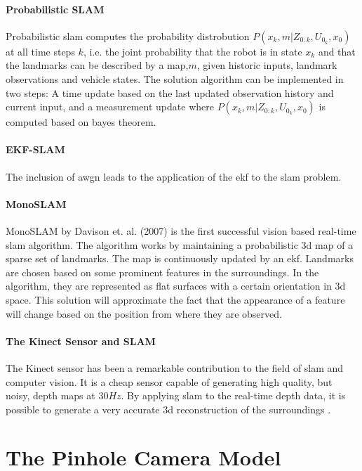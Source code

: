\paragraph{Probabilistic SLAM}
Probabilistic \gls{slam} computes the probability distrobution $P(x_k,m|Z_{0:k},U_{0_k},x_0)$ at all time steps $k$\cite{SLAMp1}, i.e. the joint probability that the robot is in state \boldmath$x_k$ and that the landmarks can be described by a map,\boldmath$m$, given historic inputs, landmark observations and vehicle states. The solution algorithm can be implemented in two steps: A time update based on the last updated observation history and current input, and a measurement update where $P(x_k,m|Z_{0:k},U_{0_k},x_0)$ is computed based on bayes theorem. 


\paragraph{EKF-SLAM}

The inclusion of \gls{awgn} leads to the application of the \gls{ekf} to the \gls{slam} problem\cite{SLAMp1}.
\paragraph{MonoSLAM}

MonoSLAM by Davison et. al. (2007) is the first successful vision based real-time \gls{slam} algorithm\cite{monoSLAM}. The algorithm works by maintaining a probabilistic 3d map of a sparse set of landmarks. The map is continuously updated by an \gls{ekf}. Landmarks are chosen based on some prominent features in the surroundings. In the algorithm, they are represented as flat surfaces with a certain orientation in 3d space. This solution will approximate the fact that the appearance of a feature will change based on the position from where they are observed.

\paragraph{The Kinect Sensor and SLAM}

The Kinect sensor has been a remarkable contribution to the field of \gls{slam} and computer vision. It is a cheap sensor capable of generating high quality, but noisy, depth maps at $30 Hz$. By applying \gls{slam} to the real-time depth data, it is possible to generate a very accurate 3d reconstruction of the surroundings \cite{slamKinect}.


\section{The Pinhole Camera Model}

